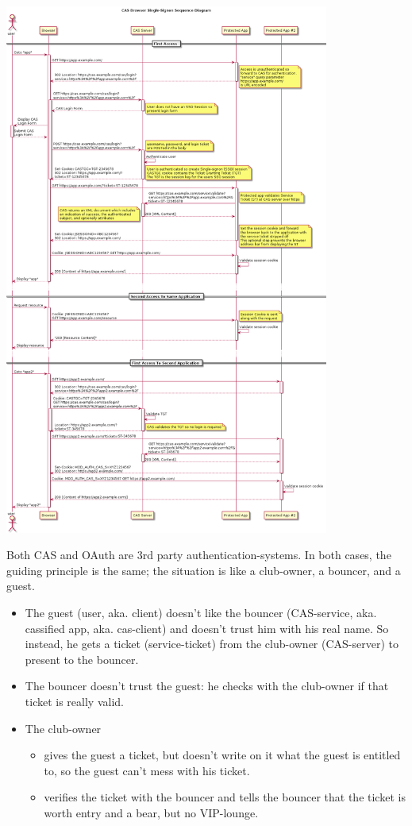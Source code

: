 \includegraphics[width=0.8\textwidth]{images/cas_flow_diagram.png}

Both CAS and OAuth are 3rd party authentication-systems. In both cases, the guiding principle is the same; the situation is like a club-owner, a bouncer, and a guest. 

\begin{itemize}
     \item The guest (user, aka. client) doesn't like the bouncer (CAS-service, aka. cassified app, aka. cas-client) and doesn't trust him with his real name. So instead, he gets a ticket (service-ticket) from the club-owner (CAS-server) to present to the bouncer.
     \item The bouncer doesn't trust the guest: he checks with the club-owner if that ticket is really valid.
     \item The club-owner \begin{itemize}
          \item gives the guest a ticket, but doesn't write on it what the guest is entitled to, so the guest can't mess with his ticket.
          \item verifies the ticket with the bouncer and tells the bouncer that the ticket is worth entry and a bear, but no VIP-lounge.
     \end{itemize}
\end{itemize}

